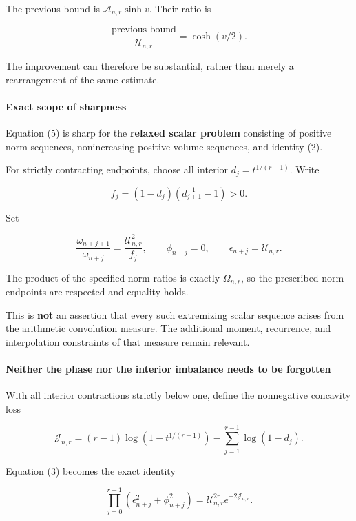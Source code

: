 The previous bound is \(\mathcal A_{n,r}\sinh v\). Their ratio is

\[
\frac{\text{previous bound}}{\mathcal U_{n,r}}
=\cosh(v/2).
\]

The improvement can therefore be substantial, rather than merely a rearrangement of the same estimate.

\paragraph{Exact scope of sharpness}\label{endpoint-user_product_original--exact-scope-of-sharpness}

Equation (5) is sharp for the \textbf{relaxed scalar problem} consisting of positive norm sequences, nonincreasing positive volume sequences, and identity (2).

For strictly contracting endpoints, choose all interior \(d_j=t^{1/(r-1)}\). Write

\[
f_j=(1-d_j)(d_{j+1}^{-1}-1)>0.
\]

Set

\[
\frac{\omega_{n+j+1}}{\omega_{n+j}}
=\frac{\mathcal U_{n,r}^2}{f_j},
\qquad
\phi_{n+j}=0,\qquad
\epsilon_{n+j}=\mathcal U_{n,r}.
\]

The product of the specified norm ratios is exactly \(\Omega_{n,r}\), so the prescribed norm endpoints are respected and equality holds.

This is \textbf{not} an assertion that every such extremizing scalar sequence arises from the arithmetic convolution measure. The additional moment, recurrence, and interpolation constraints of that measure remain relevant.

\paragraph{Neither the phase nor the interior imbalance needs to be forgotten}\label{endpoint-user_product_original--neither-the-phase-nor-the-interior-imbalance-needs-to-be-forgotten}

With all interior contractions strictly below one, define the nonnegative concavity loss

\[
\mathcal J_{n,r}
=
(r-1)\log(1-t^{1/(r-1)})
-\sum_{j=1}^{r-1}\log(1-d_j).
\]

Equation (3) becomes the exact identity

\[
\boxed{
\prod_{j=0}^{r-1}
(\epsilon_{n+j}^2+\phi_{n+j}^2)
=
\mathcal U_{n,r}^{2r}e^{-2\mathcal J_{n,r}}.
}
\tag{10}
\]

